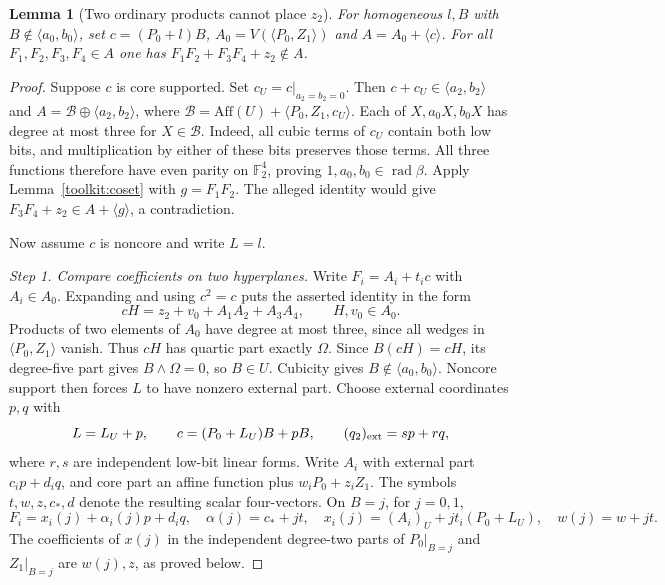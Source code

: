 \documentclass[11pt,a4paper]{article}
\theoremstyle{plain}
\newtheorem{lemma}[theorem]{Lemma}
\theoremstyle{remark}
\theoremstyle{plain}
\newcommand{\F}{\mathbb F_2}
\newcommand{\Aff}{\mathrm{Aff}}
\newcommand{\rad}{\operatorname{rad}}
\begin{document}
\begin{lemma}[Two ordinary products cannot place $z_2$]\label{l1:lem:ordinarypair}
For homogeneous $l,B$ with $B\notin\langle a_0,b_0\rangle$, set $c=(P_0+l)B$, $A_0=V(\langle P_0,Z_1\rangle)$ and $A=A_0+\langle c\rangle$. For all $F_1,F_2,F_3,F_4\in A$ one has $F_1F_2+F_3F_4+z_2\notin A$.
\end{lemma}
\begin{proof}
Suppose $c$ is core supported. Set $c_U=c|_{a_2=b_2=0}$.
Then $c+c_U\in\langle a_2,b_2\rangle$ and
$A=\mathcal B\oplus\langle a_2,b_2\rangle$, where
$\mathcal B=\Aff(U)+\langle P_0,Z_1,c_U\rangle$.
Each of $X,a_0X,b_0X$ has degree at most three for $X\in\mathcal B$.
Indeed, all cubic terms of $c_U$ contain both low bits, and
multiplication by either of these bits preserves those terms.
All three functions therefore have even parity on $\F^4$, proving
$1,a_0,b_0\in\rad\beta$. Apply Lemma~\ref{toolkit:coset}
with $g=F_1F_2$. The alleged identity would give
$F_3F_4+z_2\in A+\langle g\rangle$, a contradiction.

Now assume $c$ is noncore and write $L=l$.

\emph{Step 1. Compare coefficients on two hyperplanes.}
Write $F_i=A_i+t_ic$ with $A_i\in A_0$. Expanding and using $c^2=c$ puts the asserted identity in the form
\[
cH=z_2+v_0+A_1A_2+A_3A_4,\qquad H,v_0\in A_0.
\]
Products of two elements of $A_0$ have degree at most three, since all wedges in $\langle P_0,Z_1\rangle$ vanish. Thus $cH$ has quartic part exactly $\Omega$. Since $B(cH)=cH$, its degree-five part gives $B\wedge\Omega=0$, so $B\in U$. Cubicity gives $B\notin\langle a_0,b_0\rangle$. Noncore support then forces $L$ to have nonzero external part. Choose external coordinates $p,q$ with
\[
L=L_U+p,\qquad c=(P_0+L_U)B+pB,
\qquad (q_2)_{\rm ext}=sp+rq,
\]
where $r,s$ are independent low-bit linear forms. Write $A_i$ with external part $c_i p+d_iq$, and core part an affine function plus $w_iP_0+z_iZ_1$. The symbols $t,w,z,c_*,d$ denote the resulting scalar four-vectors. On $B=j$, for $j=0,1$,
\[
F_i=x_i(j)+\alpha_i(j)p+d_iq,\quad
\alpha(j)=c_*+jt,\quad
x_i(j)=(A_i)_U+jt_i(P_0+L_U),\quad w(j)=w+jt.
\]
The coefficients of $x(j)$ in the independent degree-two parts of $P_0\vert_{B=j}$ and $Z_1\vert_{B=j}$ are $w(j),z$, as proved below.


\end{proof}
\end{document}
